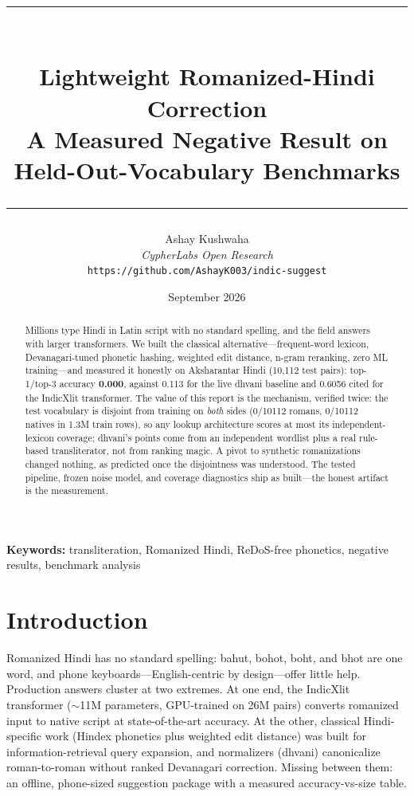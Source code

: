\documentclass[11pt,a4paper]{article}
\title{
    \vspace{-2em}
    \rule{\textwidth}{1pt}\\[0.5em]
    \textbf{Lightweight Romanized-Hindi Correction}\\[0.3em]
    \large A Measured Negative Result on Held-Out-Vocabulary Benchmarks\\[0.5em]
    \rule{\textwidth}{1pt}
}
\author{
    Ashay Kushwaha\\
    \textit{CypherLabs Open Research}\\
    \texttt{https://github.com/AshayK003/indic-suggest}
}
\date{September 2026}
\begin{document}
\maketitle

\begin{abstract}
Millions type Hindi in Latin script with no standard spelling, and the field answers with larger transformers. We built the classical alternative---frequent-word lexicon, Devanagari-tuned phonetic hashing, weighted edit distance, n-gram reranking, zero ML training---and measured it honestly on Aksharantar Hindi (10,112 test pairs): top-1/top-3 accuracy \textbf{0.000}, against 0.113 for the live dhvani baseline and 0.6056 cited for the IndicXlit transformer. The value of this report is the mechanism, verified twice: the test vocabulary is disjoint from training on \textit{both} sides (0/10112 romans, 0/10112 natives in 1.3M train rows), so any lookup architecture scores at most its independent-lexicon coverage; dhvani's points come from an independent wordlist plus a real rule-based transliterator, not from ranking magic. A pivot to synthetic romanizations changed nothing, as predicted once the disjointness was understood. The tested pipeline, frozen noise model, and coverage diagnostics ship as built---the honest artifact is the measurement.
\end{abstract}

\vspace{1em}
\noindent\textbf{Keywords:} transliteration, Romanized Hindi, ReDoS-free phonetics, negative results, benchmark analysis

\newpage
\tableofcontents
\newpage

\section{Introduction}

Romanized Hindi has no standard spelling: bahut, bohot, boht, and bhot are one word, and phone keyboards---English-centric by design---offer little help. Production answers cluster at two extremes. At one end, the IndicXlit transformer ($\sim$11M parameters, GPU-trained on 26M pairs) converts romanized input to native script at state-of-the-art accuracy. At the other, classical Hindi-specific work (Hindex phonetics plus weighted edit distance) was built for information-retrieval query expansion, and normalizers (dhvani) canonicalize roman-to-roman without ranked Devanagari correction. Missing between them: an offline, phone-sized suggestion package with a measured accuracy-vs-size table.
\end{document}
